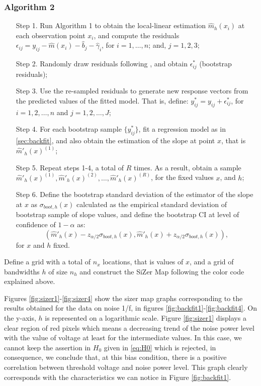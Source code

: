 \documentclass[sn-mathphys]{sn-jnl}%
\theoremstyle{thmstyleone}%
\theoremstyle{thmstyletwo}%
\theoremstyle{thmstylethree}%
\begin{document}
\subsubsection*{Algorithm 2}
\begin{enumerate}
	\item[Step 1.] Run Algorithm 1 to obtain the local-linear estimation $\widehat{m}_h(x_i)$ at each observation point $x_i$, and compute the residuals ${\epsilon}_{ij}=y_{ij}-\widehat{m}(x_i)-\widehat{b}_j-\widehat{\gamma}_i$, for $i =1,\ldots, n$; and, $j=1,2,3$; 
	
	\item[Step 2.] Randomly draw residuals following \cite{MG2015}, and obtain $\epsilon_{ij}^*$ (bootstrap residuals);
	
	\item[Step 3.] Use the re-sampled residuals to generate new response vectors from the predicted values of the fitted model. That is, define: $y_{ij}^*=y_{ij}+\epsilon_{ij}^*$, for $i=1,2,\ldots, n$ and $j=1,2,\ldots, J$;
	
	\item[Step 4.] For each bootstrap sample $\{y_{ij}^*\}$, fit a regression model as in \ref{sec:backfit}, and also obtain the estimation of the slope at point $x$, that is $\widehat{m}'_h(x)^{(1)}$;
	
	\item[Step 5.] Repeat steps 1-4, a total of $R$ times. As a result, obtain a sample $\widehat{m}'_{h}(x)^{(1)}, \widehat{m}'_{h}(x)^{(2)},\ldots, \widehat{m}'_{h}(x)^{(R)}$, for the fixed values $x$, and $h$;
	
	\item[Step 6.] Define the bootstrap standard deviation of the estimator of the slope at $x$ as  $\sigma_{boot,h}(x)$ calculated as the empirical standard deviation of bootstrap sample of slope values, and define the bootstrap CI at level of confidence of $1-\alpha$ as:
	\[
	\left(\widehat{m}'_h(x) -z_{\alpha/2} \sigma_{boot,h}(x), \widehat{m}'_h(x) +z_{\alpha/2} \sigma_{boot,h}(x)\right),
	\]
	for $x$ and $h$ fixed.
\end{enumerate}

Define a grid with a total of $n_x$ locations, that is values of $x$, and a grid of bandwidths $h$ of size $n_h$ and construct the SiZer Map following the color code explained above.


Figures \ref{fig:sizer1}-\ref{fig:sizer4} show the sizer map graphs corresponding to the results obtained for the data on noise 1/f, in figures \ref{fig:backfit1}-\ref{fig:backfit4}. On the y-axis, $h$ is represented on a logarithmic scale. Figure \ref{fig:sizer1} displays a clear region of red pixels which means a decreasing trend of the noise power level with the value of voltage at least for the intermediate values. In this case, we cannot keep the assertion in $H_0$ given in \eqref{eq:H0} which is rejected, in consequence, we conclude that, at this bias condition, there is a positive correlation between threshold voltage and noise power level. This graph clearly corresponds with the characteristics we can notice in Figure \ref{fig:backfit1}.
\end{document}
